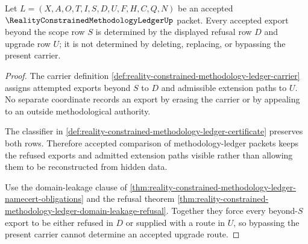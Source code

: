 \begin{theorem}
\label{thm:reality-constrained-methodology-ledger-upgrade-route-determinacy}
Let $L=(X,A,O,T,I,S,D,U,F,H,C,Q,N)$ be an accepted $\RealityConstrainedMethodologyLedgerUp$ packet. Every accepted export beyond the scope row $S$ is determined by the displayed refusal row $D$ and upgrade row $U$; it is not determined by deleting, replacing, or bypassing the present carrier.
\end{theorem}
\begin{proof}
The carrier definition \autoref{def:reality-constrained-methodology-ledger-carrier} assigns attempted exports beyond $S$ to $D$ and admissible extension paths to $U$. No separate coordinate records an export by erasing the carrier or by appealing to an outside methodological authority.

The classifier in \autoref{def:reality-constrained-methodology-ledger-certificate} preserves both rows. Therefore accepted comparison of methodology-ledger packets keeps the refused exports and admitted extension paths visible rather than allowing them to be reconstructed from hidden data.

Use the domain-leakage clause of \autoref{thm:reality-constrained-methodology-ledger-namecert-obligations} and the refusal theorem \autoref{thm:reality-constrained-methodology-ledger-domain-leakage-refusal}. Together they force every beyond-$S$ export to be either refused in $D$ or supplied with a route in $U$, so bypassing the present carrier cannot determine an accepted upgrade route.
\end{proof}

